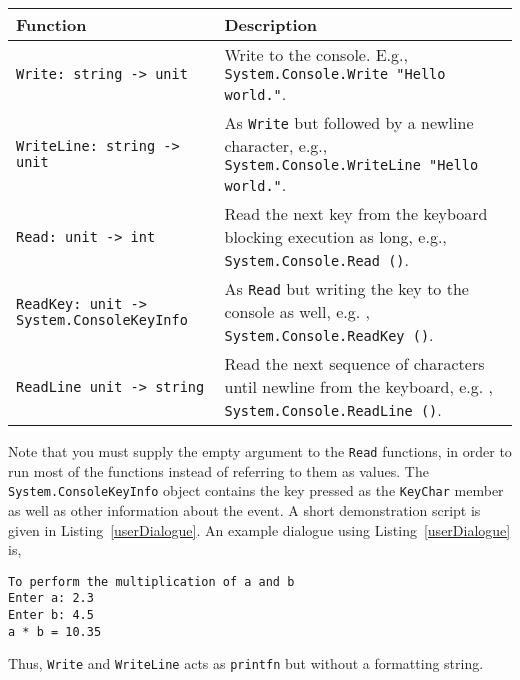 \begin{center}
  \begin{tabularx}{\linewidth}{|l|X|}
    \hline
    \rowcolor{headerRowColor} Function & Description\\
    \hline
    \lstinline{Write: string -> unit} & Write to the console. E.g., \mbox{\lstinline!System.Console.Write "Hello world."!}.\\
    \hline
    \lstinline{WriteLine: string -> unit} & As \lstinline!Write! but followed by a newline character, e.g., \mbox{\lstinline!System.Console.WriteLine "Hello world."!}.\\
    \hline
    \lstinline{Read: unit -> int} & Read the next key from the keyboard blocking execution as long, e.g., \mbox{\lstinline!System.Console.Read ()!}.\\
    \hline
    \lstinline{ReadKey: unit -> System.ConsoleKeyInfo} & As \lstinline!Read! but writing the key to the console as well, e.g. , \mbox{\lstinline!System.Console.ReadKey ()!}.\\
    \hline
    \lstinline{ReadLine unit -> string} & Read the next sequence of characters until newline from the keyboard, e.g. , \mbox{\lstinline!System.Console.ReadLine ()!}.\\
    \hline
  \end{tabularx}
\end{center}
Note that you must supply the empty argument \lexeme{()} to the \lstinline!Read! functions, in order to run most of the functions instead of referring to them as values. The \lstinline!System.ConsoleKeyInfo! object contains the key pressed as the \lstinline!KeyChar! member as well as other information about the event. A short demonstration script is given in Listing~\ref{userDialogue}.
%
%
An example dialogue using Listing~\ref{userDialogue} is,
%
\begin{lstlisting}[language=console]
To perform the multiplication of a and b
Enter a: 2.3
Enter b: 4.5
a * b = 10.35
\end{lstlisting}
%
Thus, \lstinline!Write! and \lstinline!WriteLine! acts as \lstinline!printfn! but without a formatting string. 
 
